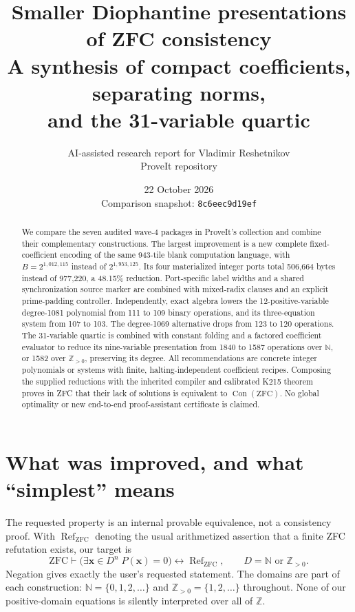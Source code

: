 \documentclass[11pt]{article}
\title{Smaller Diophantine presentations\\of ZFC consistency\vspace{0.4em}\\\large A synthesis of compact coefficients, separating norms,\\and the 31-variable quartic}
\author{AI-assisted research report for Vladimir Reshetnikov\\ProveIt repository}
\date{22 October 2026\\\small Comparison snapshot: \texttt{8c6eec9d19ef}}
\newcommand{\N}{\mathbb N}
\newcommand{\Z}{\mathbb Z}
\newcommand{\Pos}{\mathbb Z_{>0}}
\newcommand{\Con}{\operatorname{Con}}
\begin{document}
\maketitle
\begin{abstract}
We compare the seven audited wave-4 packages in ProveIt's collection and
combine their complementary constructions. The largest improvement is a new
complete fixed-coefficient encoding of the same 943-tile blank computation
language, with $B=2^{1,012,115}$ instead of $2^{1,953,125}$. Its four materialized
integer ports total 506,664 bytes instead of 977,220, a 48.15\% reduction.
Port-specific label widths and a shared synchronization source marker are
combined with mixed-radix clauses and an explicit prime-padding controller.
Independently, exact algebra lowers the 12-positive-variable degree-1081
polynomial from 111 to 109 binary operations, and its three-equation system
from 107 to 103. The degree-1069 alternative drops from 123 to 120 operations.
The 31-variable quartic is combined with constant folding and a factored
coefficient evaluator to reduce its nine-variable presentation from 1840 to
1587 operations over $\N$, or 1582 over $\Pos$, preserving its degree.
All recommendations are concrete integer polynomials or systems with finite,
halting-independent coefficient recipes. Composing the supplied reductions
with the inherited compiler and calibrated K215 theorem proves in ZFC that
their lack of solutions is equivalent to $\Con(\mathrm{ZFC})$.
No global optimality or new end-to-end proof-assistant certificate is claimed.
\end{abstract}

\begingroup
\small
\setlength{\parskip}{0pt}
\tableofcontents
\endgroup
\newpage

\section{What was improved, and what ``simplest'' means}

The requested property is an internal provable equivalence, not a consistency
proof. With $\operatorname{Ref}_{\mathrm{ZFC}}$ denoting the usual arithmetized
assertion that a finite ZFC refutation exists, our target is
\[
 \mathrm{ZFC}\vdash
 \bigl(\exists\mathbf x\in D^n\;P(\mathbf x)=0\bigr)
 \longleftrightarrow \operatorname{Ref}_{\mathrm{ZFC}},
 \qquad D=\N\text{ or }\Pos.
\]
Negation gives exactly the user's requested statement. The domains are part of
each construction: $\N=\{0,1,2,\ldots\}$ and $\Pos=\{1,2,\ldots\}$ throughout.
None of our positive-domain equations is silently interpreted over all of $\Z$.
\end{document}
